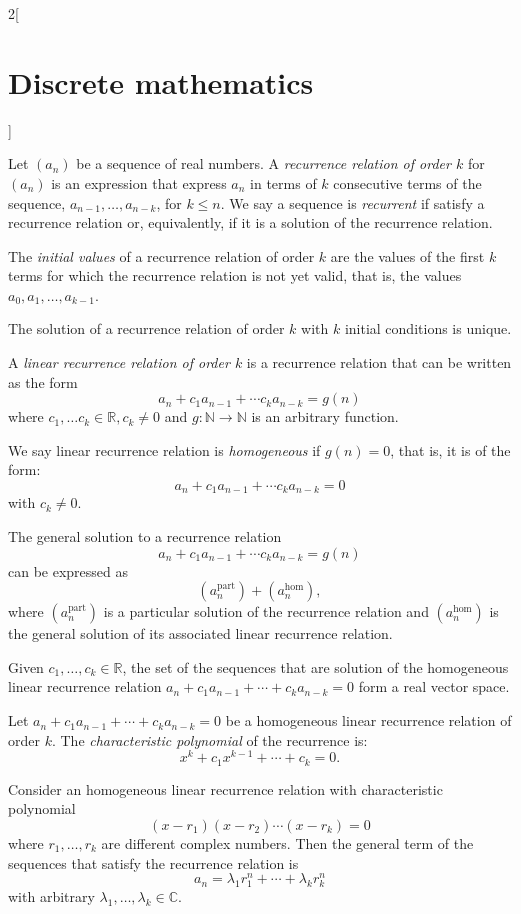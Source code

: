 \documentclass[class=article,10pt,crop=false]{standalone}
\begin{document}
\begin{multicols}{2}[\section{Discrete mathematics}]
\begin{prop}
\end{prop}
\begin{definition}
Let $(a_n)$ be a sequence of real numbers. A \textit{recurrence relation of order $k$} for $(a_n)$ is an expression that express $a_n$ in terms of $k$ consecutive terms of the sequence, $a_{n-1},\ldots,a_{n-k}$, for $k\leq n$. We say a sequence is \textit{recurrent} if satisfy a recurrence relation or, equivalently, if it is a solution of the recurrence relation.
\end{definition}
\begin{definition}
The \textit{initial values} of a recurrence relation of order $k$ are the values of the first $k$ terms for which the recurrence relation is not yet valid, that is, the values $a_0,a_1,\ldots,a_{k-1}$.
\end{definition}
\begin{lemma}
The solution of a recurrence relation of order $k$ with $k$ initial conditions is unique.
\end{lemma}
\begin{definition}
A \textit{linear recurrence relation of order $k$} is a recurrence relation that can be written as the form $$a_n+c_1a_{n-1}+\cdots c_ka_{n-k}=g(n)$$ where $c_1,\ldots c_k\in\mathbb{R},c_k\ne 0$ and $g:\mathbb{N}\rightarrow\mathbb{N}$ is an arbitrary function.
\end{definition}
\begin{definition}
We say linear recurrence relation is \textit{homogeneous} if $g(n)=0$, that is, it is of the form: $$a_n+c_1a_{n-1}+\cdots c_ka_{n-k}=0$$ with $c_k\ne 0$.
\end{definition}
\begin{prop}
The general solution to a recurrence relation $$a_n+c_1a_{n-1}+\cdots c_ka_{n-k}=g(n)$$ can be expressed as $$(a_n^\text{part})+(a_n^\text{hom}),$$ where $(a_n^\text{part})$ is a particular solution of the recurrence relation and $(a_n^\text{hom})$ is the general solution of its associated linear recurrence relation.
\end{prop}
\begin{prop}
Given $c_1,\ldots,c_k\in\mathbb{R}$, the set of the sequences that are solution of the homogeneous linear recurrence relation $a_n+c_1a_{n-1}+\cdots+c_ka_{n-k}=0$ form a real vector space.
\end{prop}
\begin{definition}
Let $a_n+c_1a_{n-1}+\cdots+c_ka_{n-k}=0$ be a homogeneous linear recurrence relation of order $k$. The \textit{characteristic polynomial} of the recurrence is: $$x^k+c_1x^{k-1}+\cdots+c_k=0.$$
\end{definition}
\begin{prop}
Consider an homogeneous linear recurrence relation with characteristic polynomial $$(x-r_1)(x-r_2)\cdots(x-r_k)=0$$ where $r_1,\ldots,r_k$ are different complex numbers. Then the general term of the sequences that satisfy the recurrence relation is $$a_n=\lambda_1r_1^n+\cdots+\lambda_kr_k^n$$ with arbitrary $\lambda_1,\ldots,\lambda_k\in\mathbb{C}$.
\end{prop}

\end{multicols}
\end{document}
